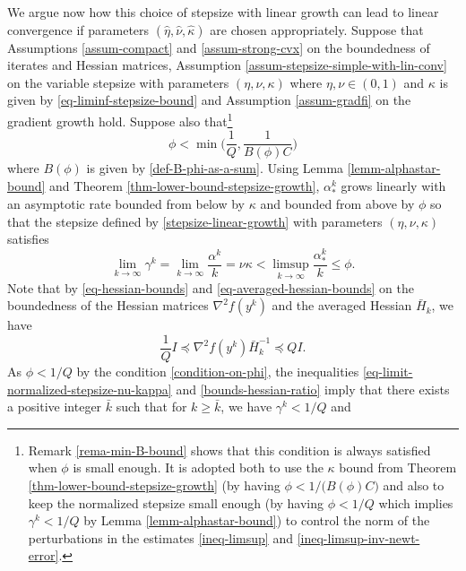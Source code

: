 \documentclass[final,numbook]{svjour3}
\begin{document}
We argue now how this choice of stepsize with linear growth can lead to linear convergence if parameters $(\widehat\eta,\widehat\nu,\widehat\kappa)$ are chosen appropriately. Suppose that Assumptions \ref{assum-compact} and \ref{assum-strong-cvx} on the boundedness of iterates and Hessian matrices, Assumption \ref{assum-stepsize-simple-with-lin-conv} on the variable stepsize with parameters $(\eta,  \nu,\kappa)$ where $\eta,\nu \in (0,1)$ and $\kappa$ is given by \eqref{eq-liminf-stepsize-bound} and Assumption \ref{assum-gradfi} on the gradient growth hold. Suppose also that\footnote{Remark \ref{rema-min-B-bound} shows that this condition is always satisfied when $\phi$ is small enough. It is adopted both to use the $\kappa$ bound from Theorem \ref{thm-lower-bound-stepsize-growth} (by having $\phi < 1 / \big( B(\phi)C \big)$ and also to keep the normalized stepsize small enough (by having $\phi < 1/Q$ which implies $\gamma^k < 1/Q$ by Lemma \ref{lemm-alphastar-bound}) to control the norm of the perturbations in the estimates \eqref{ineq-limsup} and \eqref{ineq-limsup-inv-newt-error}.} 
\begin{equation}\label{condition-on-phi}\phi < \min\bigg(\frac{1}{Q},\frac{1}{B(\phi)C}\bigg)
\end{equation} where $B(\phi)$ is given by \eqref{def-B-phi-as-a-sum}. Using Lemma \ref{lemm-alphastar-bound} and Theorem \ref{thm-lower-bound-stepsize-growth}, $\alpha_*^k$ grows linearly with an asymptotic rate bounded from below by $\kappa$ and bounded from above by $\phi$ so that the stepsize defined by \eqref{stepsize-linear-growth} with parameters $(\eta,\nu,\kappa)$ satisfies 
 \begin{equation}\label{eq-limit-normalized-stepsize-nu-kappa} \lim_{k \to \infty} \gamma^k = \lim_{k \to \infty} \frac{\alpha^k}{k} = \nu \kappa < \limsup_{k \to \infty} \frac{\alpha_*^k}{k} \leq \phi.
    \end{equation}
Note that by \eqref{eq-hessian-bounds} and \eqref{eq-averaged-hessian-bounds} on the boundedness of the Hessian matrices $\nabla^2 f(y^k)$ and the averaged Hessian $\bar{H}_k$, we have 
    \begin{equation}\label{bounds-hessian-ratio} \frac{1}{Q}I \preceq \nabla^2 f(y^k) \bar{H}_k^{-1} \preceq Q I. 
    \end{equation} 
As $\phi < 1/Q$ by the condition \eqref{condition-on-phi}, the inequalities \eqref{eq-limit-normalized-stepsize-nu-kappa} and \eqref{bounds-hessian-ratio} imply that there exists a positive integer $\bar{k}$ such that for $k\geq \bar{k}$, we have $\gamma^k < 1/Q$ and 
\end{document}
